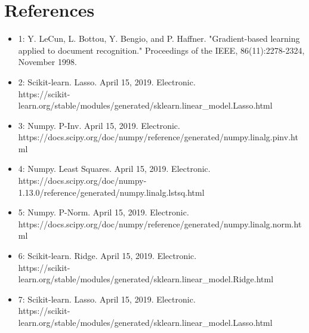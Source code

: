 \documentclass[12pt]{article}
\begin{document}
	\section{References}
	\begin{itemize}
		\item 1: Y. LeCun, L. Bottou, Y. Bengio, and P. Haffner. "Gradient-based learning applied to document recognition." Proceedings of the IEEE, 86(11):2278-2324, November 1998.
		\item 2: Scikit-learn. Lasso. April 15, 2019. Electronic.\\  https://scikit-learn.org/stable/modules/generated/sklearn.linear\_model.Lasso.html
		\item 3: Numpy. P-Inv. April 15, 2019. Electronic. \\ https://docs.scipy.org/doc/numpy/reference/generated/numpy.linalg.pinv.html
		\item 4: Numpy. Least Squares. April 15, 2019. Electronic.\\  https://docs.scipy.org/doc/numpy-1.13.0/reference/generated/numpy.linalg.lstsq.html
		\item 5: Numpy. P-Norm. April 15, 2019. Electronic.\\ https://docs.scipy.org/doc/numpy/reference/generated/numpy.linalg.norm.html
		\item 6: Scikit-learn. Ridge. April 15, 2019. Electronic.\\ https://scikit-learn.org/stable/modules/generated/sklearn.linear\_model.Ridge.html
		\item 7: Scikit-learn. Lasso. April 15, 2019. Electronic.\\ https://scikit-learn.org/stable/modules/generated/sklearn.linear\_model.Lasso.html
	\end{itemize}
\end{document}

